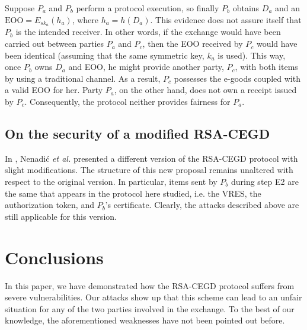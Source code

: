 \documentclass{article}
\begin{document}
Suppose $P_a$ and $P_b$ perform a protocol execution, so finally
$P_b$ obtains $D_a$ and an $\mathrm{EOO} = E_{sk_a}(h_a)$, where
$h_a = h(D_a)$. This evidence does not assure itself that $P_b$ is
the intended receiver. In other words, if the exchange would have
been carried out between parties $P_a$ and $P_c$, then the EOO
received by $P_c$ would have been identical (assuming that the same
symmetric key, $k_a$ is used). This way, once $P_b$ owns $D_a$ and
EOO, he might provide another party, $P_c$, with both items by using
a traditional channel. As a result, $P_c$ possesses the e-goods
coupled with a valid EOO for her. Party $P_a$, on the other hand,
does not own a receipt issued by $P_c$. Consequently, the protocol
neither provides fairness for $P_a$.

\subsection{On the security of a modified RSA-CEGD}\label{Sec:OtherVersion}
In \cite{NZCG05}, Nenadi\'c \emph{et al.} presented a different
version of the RSA-CEGD protocol with slight modifications. The
structure of this new proposal remains unaltered with respect to the
original version. In particular, items sent by $P_b$ during step E2
are the same that appears in the protocol here studied, i.e. the
VRES, the authorization token, and $P_b$'s certificate. Clearly, the
attacks described above are still applicable for this version.


\section{Conclusions}\label{Sec:Conclusions}
In this paper, we have demonstrated how the RSA-CEGD protocol
suffers from severe vulnerabilities. Our attacks show up that this
scheme can lead to an unfair situation for any of the two parties
involved in the exchange. To the best of our knowledge, the
aforementioned weaknesses have not been pointed out before.
\end{document}

